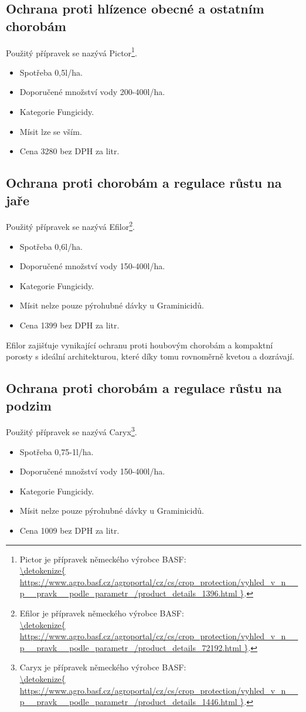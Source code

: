 \subsection{Ochrana proti hlízence obecné a ostatním chorobám}
Použitý přípravek se nazývá Pictor\footnote{Pictor je přípravek německého výrobce BASF: \\\url{\detokenize{
https://www.agro.basf.cz/agroportal/cz/cs/crop_protection/vyhled_v_n__p__pravk__podle_parametr_/product_details_1396.html
}}.}.
\begin{itemize}
  \item Spotřeba 0,5l/ha.
  \item Doporučené množství vody 200-400l/ha.
  \item Kategorie Fungicidy.
  \item Mísit lze se vším.
  \item Cena 3280 bez DPH za litr.
\end{itemize}

\subsection{Ochrana proti chorobám a regulace růstu na jaře}
Použitý přípravek se nazývá Efilor\footnote{Efilor je přípravek německého výrobce BASF: \\\url{\detokenize{
https://www.agro.basf.cz/agroportal/cz/cs/crop_protection/vyhled_v_n__p__pravk__podle_parametr_/product_details_72192.html
}}.}.
\begin{itemize}
  \item Spotřeba 0,6l/ha.
  \item Doporučené množství vody 150-400l/ha.
  \item Kategorie Fungicidy.
  \item Mísit nelze pouze pýrohubné dávky u Graminicidů.
  \item Cena 1399 bez DPH za litr.
\end{itemize}
Efilor zajišťuje vynikající ochranu proti houbovým chorobám a kompaktní porosty s ideální architekturou, které díky tomu rovnoměrně kvetou a dozrávají.

\subsection{Ochrana proti chorobám a regulace růstu na podzim}
Použitý přípravek se nazývá Caryx\footnote{Caryx je přípravek německého výrobce BASF: \\\url{\detokenize{
https://www.agro.basf.cz/agroportal/cz/cs/crop_protection/vyhled_v_n__p__pravk__podle_parametr_/product_details_1446.html
}}.}.
\begin{itemize}
  \item Spotřeba 0,75-1l/ha.
  \item Doporučené množství vody 150-400l/ha.
  \item Kategorie Fungicidy.
  \item Mísit nelze pouze pýrohubné dávky u Graminicidů.
  \item Cena 1009 bez DPH za litr.
\end{itemize}

